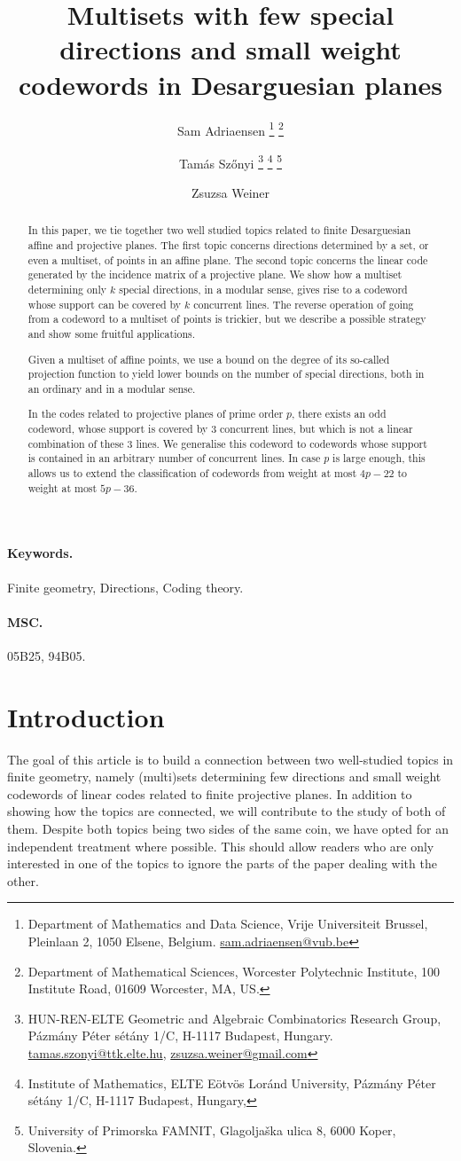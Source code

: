 \documentclass[12pt, a4paper]{article}
\title{Multisets with few special directions and small weight codewords in Desarguesian planes}
\author{
 Sam Adriaensen
  \thanks{Department of Mathematics and Data Science, Vrije Universiteit Brussel, Pleinlaan 2, 1050 Elsene, Belgium. \href{mailto:sam.adriaensen@vub.be}{sam.adriaensen@vub.be}} 
  \thanks{Department of Mathematical Sciences, Worcester Polytechnic Institute, 100 Institute Road, 01609 Worcester, MA, US.}
 \and Tam\'as Sz\H onyi
  \thanks{HUN-REN-ELTE Geometric and Algebraic Combinatorics Research Group, P\'azm\'any P\'eter s\'et\'any 1/C, H-1117 Budapest, Hungary.
   \href{mailto:tamas.szonyi@ttk.elte.hu}{tamas.szonyi@ttk.elte.hu},
   \href{mailto:zsuzsa.weiner@gmail.com}{zsuzsa.weiner@gmail.com}} 
  \thanks{Institute of Mathematics, ELTE E\"otv\"os Lor\'and University, P\'azm\'any P\'eter s\'et\'any 1/C, H-1117 Budapest, Hungary,}
  \thanks{University of Primorska FAMNIT, Glagolja\v ska ulica 8, 6000 Koper, Slovenia.}
 \and Zsuzsa Weiner
  \footnotemark[3]
}
\date{}
\theoremstyle{definition}
\begin{document}
\maketitle

\begin{abstract}
 In this paper, we tie together two well studied topics related to finite Desarguesian affine and projective planes.
 The first topic concerns directions determined by a set, or even a multiset, of points in an affine plane.
 The second topic concerns the linear code generated by the incidence matrix of a projective plane.
 We show how a multiset determining only $k$ special directions, in a modular sense, gives rise to a codeword whose support can be covered by $k$ concurrent lines.
 The reverse operation of going from a codeword to a multiset of points is trickier, but we describe a possible strategy and show some fruitful applications.

 Given a multiset of affine points, we use a bound on the degree of its so-called projection function to yield lower bounds on the number of special directions, both in an ordinary and in a modular sense.
 
 In the codes related to projective planes of prime order $p$, there exists an odd codeword, whose support is covered by 3 concurrent lines, but which is not a linear combination of these 3 lines.
 We generalise this codeword to codewords whose support is contained in an arbitrary number of concurrent lines.
 In case $p$ is large enough, this allows us to extend the classification of codewords from weight at most $4p-22$ to weight at most $5p-36$.
\end{abstract}

\paragraph{Keywords.} Finite geometry, Directions, Coding theory.

\paragraph{MSC.} 05B25, %
94B05. %

\section{Introduction}

The goal of this article is to build a connection between two well-studied topics in finite geometry, namely (multi)sets determining few directions and small weight codewords of linear codes related to finite projective planes.
In addition to showing how the topics are connected, we will contribute to the study of both of them.
Despite both topics being two sides of the same coin, we have opted for an independent treatment where possible.
This should allow readers who are only interested in one of the topics to ignore the parts of the paper dealing with the other.
\end{document}
